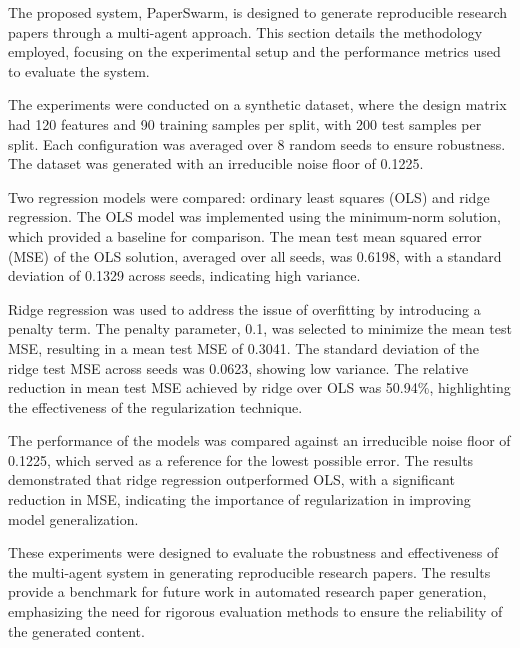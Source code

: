 The proposed system, PaperSwarm, is designed to generate reproducible research papers through a multi-agent approach. This section details the methodology employed, focusing on the experimental setup and the performance metrics used to evaluate the system.

The experiments were conducted on a synthetic dataset, where the design matrix had 120 features and 90 training samples per split, with 200 test samples per split. Each configuration was averaged over 8 random seeds to ensure robustness. The dataset was generated with an irreducible noise floor of 0.1225.

Two regression models were compared: ordinary least squares (OLS) and ridge regression. The OLS model was implemented using the minimum-norm solution, which provided a baseline for comparison. The mean test mean squared error (MSE) of the OLS solution, averaged over all seeds, was 0.6198, with a standard deviation of 0.1329 across seeds, indicating high variance.

Ridge regression was used to address the issue of overfitting by introducing a penalty term. The penalty parameter, 0.1, was selected to minimize the mean test MSE, resulting in a mean test MSE of 0.3041. The standard deviation of the ridge test MSE across seeds was 0.0623, showing low variance. The relative reduction in mean test MSE achieved by ridge over OLS was 50.94\%, highlighting the effectiveness of the regularization technique.

The performance of the models was compared against an irreducible noise floor of 0.1225, which served as a reference for the lowest possible error. The results demonstrated that ridge regression outperformed OLS, with a significant reduction in MSE, indicating the importance of regularization in improving model generalization.

These experiments were designed to evaluate the robustness and effectiveness of the multi-agent system in generating reproducible research papers. The results provide a benchmark for future work in automated research paper generation, emphasizing the need for rigorous evaluation methods to ensure the reliability of the generated content.
